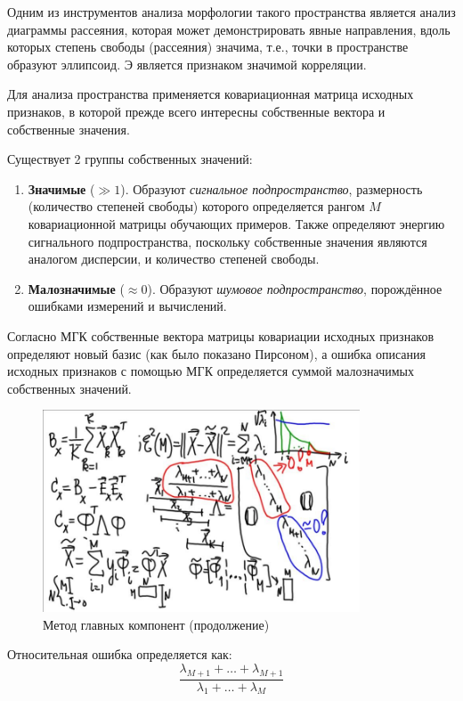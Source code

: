 \documentclass{article}
\numberwithin{equation}{subsection}
\begin{document}
Одним из инструментов анализа морфологии такого пространства является анализ диаграммы рассеяния,
которая может демонстрировать явные направления, вдоль которых степень свободы (рассеяния)
значима, т.е., точки в пространстве образуют эллипсоид. Э является признаком значимой корреляции.

Для анализа пространства применяется ковариационная матрица исходных признаков, в которой 
прежде всего интересны собственные вектора и собственные значения.

Существует 2 группы собственных значений: 

\begin{enumerate}
    \item \textbf{Значимые} ($\gg1$). Образуют \textit{сигнальное подпространство},
        размерность (количество степеней свободы) которого определяется рангом $M$ 
        ковариационной матрицы обучающих примеров.
        Также определяют энергию сигнального подпространства, поскольку собственные значения 
        являются аналогом дисперсии, и количество степеней свободы.
    \item \textbf{Малозначимые} ($\approx 0$). Образуют \textit{шумовое подпространство},
        порождённое ошибками измерений и вычислений.
\end{enumerate}

Согласно МГК собственные вектора матрицы ковариации исходных признаков определяют новый
базис (как было показано Пирсоном), а ошибка описания исходных признаков с помощью МГК
определяется суммой малозначимых собственных значений.

\begin{figure}[htbp]
    \centering
    \includegraphics[height=6cm]{hyperflat_12__1.jpeg}
    \caption{Метод главных компонент (продолжение)}
    \label{hyperflat_12__1}
\end{figure}

Относительная ошибка определяется как:
\begin{equation}
    \dfrac{\lambda_{M+1}+\dots+\lambda_{M+1}}{\lambda_1+\dots+\lambda_M}
\end{equation}
\end{document}
